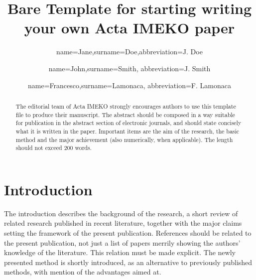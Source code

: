 \documentclass{imeko_acta}
\begin{document}
\title{Bare Template for starting writing your own Acta IMEKO paper} %

\author[1]{name=Jane,surname=Doe,abbreviation=J. Doe}
\author[2]{name=John,surname=Smith, abbreviation=J. Smith}
\author[3,4]{name=Francesco,surname=Lamonaca, abbreviation=F. Lamonaca}






\begin{abstract}
The editorial team of Acta IMEKO strongly encourages 
authors to use this \LaTeXe template file to produce their manuscript. 
The abstract should be composed in a way suitable for publication 
in the abstract section of electronic journals, 
and should state concisely what it is written in the paper. 
Important items are the aim of the research, the basic method and the major achievement 
(also numerically, when applicable). The length should not exceed 200 words.
\end{abstract}

\maketitle %

\section{Introduction}

The introduction describes the background of the research, a 
short review of related research published in recent literature, 
together with the major claims setting the framework of the 
present publication. References should be related to the present 
publication, not just a list of papers merrily showing the authors'
knowledge of the literature. This relation must be made explicit. 
The newly presented method is shortly introduced, as an 
alternative to previously published methods, with mention of the 
advantages aimed at.
\end{document}
